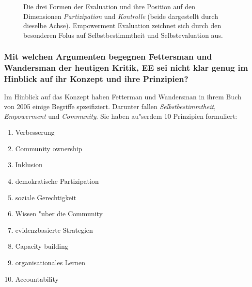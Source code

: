 \begin{figure}[h!]
        \begin{center}
        \end{center}
        \caption{Die drei Formen der Evaluation und ihre Position auf den Dimensionen \emph{Partizipation} und \emph{Kontrolle} (beide dargestellt durch dieselbe Achse). Empowerment Evaluation zeichnet sich durch den besonderen Folus auf Selbstbestimmtheit und Selbstevaluation aus.}
        \label{fig:fetterman1}
\end{figure}

\subsubsection{Mit welchen Argumenten begegnen Fettersman und Wandersman der heutigen Kritik, EE sei nicht klar genug im Hinblick auf ihr Konzept und ihre Prinzipien?}
Im Hinblick auf das Konzept haben Fetterman und Wandersman in ihrem Buch von 2005 einige Begriffe spzeifiziert. Darunter fallen \emph{Selbstbestimmtheit}, \emph{Empowerment} und \emph{Community}. Sie haben au"serdem $10$ Prinzipien formuliert:
\begin{enumerate}
        \item Verbesserung
        \item Community ownership
        \item Inklusion
        \item demokratische Partizipation
        \item soziale Gerechtigkeit
        \item Wissen "uber die Community
        \item evidenzbasierte Strategien
        \item Capacity building
        \item organisationales Lernen
        \item Accountability
\end{enumerate}

